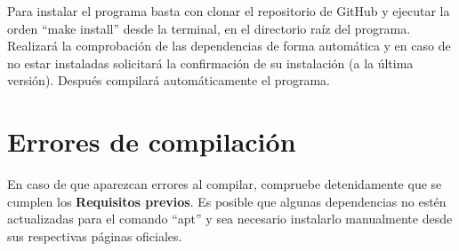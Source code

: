 Para instalar el programa basta con clonar el repositorio de GitHub y ejecutar la orden ``make install'' desde la terminal, en el directorio raíz del programa. Realizará la comprobación de las dependencias de forma automática y en caso de no estar instaladas solicitará la confirmación de su instalación (a la última versión). Después compilará automáticamente el programa.

\section{Errores de compilación}

En caso de que aparezcan errores al compilar, compruebe detenidamente que se cumplen los \textbf{Requisitos previos}. Es posible que algunas dependencias no estén actualizadas para el comando ``apt'' y sea necesario instalarlo manualmente desde sus respectivas páginas oficiales.

\endinput
